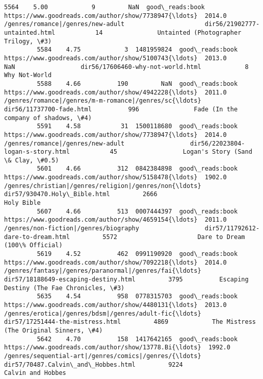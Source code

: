 \documentclass[11pt]{article}
\begin{document}
\begin{Verbatim}[commandchars=\\\{\}]
         5564    5.00            9         NaN  good\_reads:book  https://www.goodreads.com/author/show/7738947{\ldots}  2014.0                  /genres/romance|/genres/new-adult                      dir56/21902777-untainted.html           14               Untainted (Photographer Trilogy, \#3)
         5584    4.75            3  1481959824  good\_reads:book  https://www.goodreads.com/author/show/5100743{\ldots}  2013.0                                                NaN                  dir56/17606460-why-not-world.html            8                                      Why Not-World
         5588    4.66          190         NaN  good\_reads:book  https://www.goodreads.com/author/show/4942228{\ldots}  2011.0  /genres/romance|/genres/m-m-romance|/genres/sc{\ldots}                           dir56/11737700-fade.html          996               Fade (In the company of shadows, \#4)
         5591    4.58           31  1500118680  good\_reads:book  https://www.goodreads.com/author/show/7738947{\ldots}  2014.0                  /genres/romance|/genres/new-adult                  dir56/22023804-logan-s-story.html           45                  Logan's Story (Sand \& Clay, \#0.5)
         5601    4.66          312  0842384898  good\_reads:book  https://www.goodreads.com/author/show/5158478{\ldots}  1902.0  /genres/christian|/genres/religion|/genres/non{\ldots}                       dir57/930470.Holy\_Bible.html         2666                                         Holy Bible
         5607    4.66          513  0007444397  good\_reads:book  https://www.goodreads.com/author/show/4659154{\ldots}  2011.0              /genres/non-fiction|/genres/biography                  dir57/11792612-dare-to-dream.html         5572                      Dare to Dream (100\% Official)
         5619    4.52          462  0991190920  good\_reads:book  https://www.goodreads.com/author/show/7092218{\ldots}  2014.0  /genres/fantasy|/genres/paranormal|/genres/fai{\ldots}               dir57/18188649-escaping-destiny.html         3795          Escaping Destiny (The Fae Chronicles, \#3)
         5635    4.54          958  0778315703  good\_reads:book  https://www.goodreads.com/author/show/4480131{\ldots}  2013.0  /genres/erotica|/genres/bdsm|/genres/adult-fic{\ldots}                   dir57/17251444-the-mistress.html         4869            The Mistress (The Original Sinners, \#4)
         5642    4.70          158  1417642165  good\_reads:book  https://www.goodreads.com/author/show/13778.Bi{\ldots}  1992.0  /genres/sequential-art|/genres/comics|/genres/{\ldots}                 dir57/70487.Calvin\_and\_Hobbes.html         9224                                  Calvin and Hobbes

\end{Verbatim}
\end{document}
